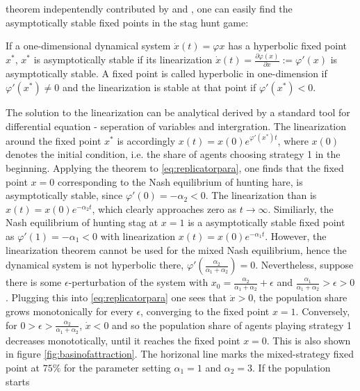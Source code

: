 \documentclass[11pt]{article}
\begin{document}
theorem indepentendly contributed by \cite{hartman_lemma_1960} and 
\cite{grobman_homeomorphism_1959}, one can easily 
find the asymptotically stable fixed points in the stag hunt game:
\begin{mydef}
        If a one-dimensional dynamical system $\dot{x}(t) = \varphi{x}$ 
        has a hyperbolic fixed point $x^*$, $x^*$ is asymptotically stable
        if its linearization 
        $\dot{x}(t) = \frac{\partial\varphi(x)}{\partial x} := \varphi'(x)$ 
        is asymptotically stable. 
        A fixed point is called hyperbolic in one-dimension if 
        $\varphi'(x^*) \neq 0$ and the linearization is stable at that
        point if $\varphi'(x^*) < 0$.
\end{mydef}
The solution to the linearization can be analytical derived by 
a standard tool for differential equation - seperation of variables and 
intergration.
The linearization around the fixed point $x^*$ is accordingly
$x(t)= x(0) e^{\varphi'(x^*)t}$, where $x(0)$ denotes the 
initial condition, i.e. the share of agents choosing strategy 1 in the 
beginning.
Applying the theorem to \eqref{eq:replicatorpara}, one finds that the 
fixed point $x=0$ corresponding to the Nash equilibrium of hunting hare, is 
asymptotically stable, since $\varphi'(0) = - \alpha_2 <0$. 
The linearization than is $x(t) = x(0) e^{-\alpha_2 t}$, which clearly 
approaches zero as $t \rightarrow \infty$. Similiarly, the Nash equilibrium 
of hunting stag at $x=1$ is a asymptotically stable fixed point as
$\varphi'(1) = -\alpha_1 <0$ with linearization $x(t) = x(0) e^{-\alpha_1 t}$.
However, the linearization theorem cannot be used for the mixed Nash 
equilibrium, hence the dynamical system is not hyperbolic there, 
$\varphi'(\frac{\alpha_2}{\alpha_1+\alpha_2}) = 0$. Nevertheless, suppose 
there is some $\epsilon$-perturbation of the system  
 with $x_0= \frac{\alpha_2}{\alpha_1+\alpha_2}+ \epsilon$ and 
 $\frac{\alpha_1}{\alpha_1+\alpha_2} > \epsilon > 0$. Plugging this into
 \eqref{eq:replicatorpara} one sees that $\dot{x} >0$, the population share
 grows monotonically for every $\epsilon$, converging to the fixed point 
 $x = 1$. Conversely, for $0 > \epsilon > \frac{\alpha_2}{\alpha_1+\alpha_2}$,
 $\dot{x} < 0$ and so the population share of agents 
 playing strategy 1 decreases monototically, until it reaches the 
 fixed point $x=0$. This is also shown in figure \ref{fig:basinofattraction}.
 The horizonal line marks the mixed-strategy fixed point at $75\%$ for the
 parameter setting $\alpha_1 = 1$ and $\alpha_2=3$. If the population starts
\end{document}
